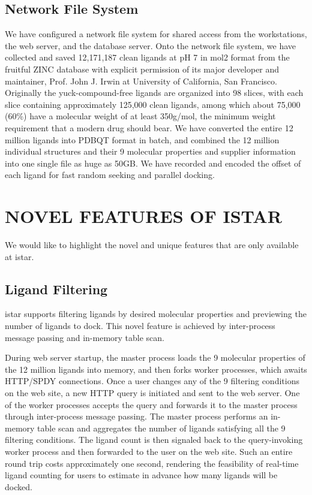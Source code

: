 \documentclass[12pt]{article}
\begin{document}
\subsection*{\sffamily \large Network File System}

We have configured a network file system for shared access from the workstations, the web server, and the database server. Onto the network file system, we have collected and saved 12,171,187 clean ligands at pH 7 in mol2 format from the fruitful ZINC database \citep{532,1178} with explicit permission of its major developer and maintainer, Prof. John J. Irwin at University of California, San Francisco. Originally the yuck-compound-free ligands are organized into 98 slices, with each slice containing approximately 125,000 clean ligands, among which about 75,000 (60\%) have a molecular weight of at least 350g/mol, the minimum weight requirement that a modern drug should bear. We have converted the entire 12 million ligands into PDBQT format in batch, and combined the 12 million individual structures and their 9 molecular properties and supplier information into one single file as huge as 50GB. We have recorded and encoded the offset of each ligand for fast random seeking and parallel docking.

\section*{\sffamily \Large NOVEL FEATURES OF ISTAR}

We would like to highlight the novel and unique features that are only available at istar.

\subsection*{\sffamily \large Ligand Filtering}

istar supports filtering ligands by desired molecular properties and previewing the number of ligands to dock. This novel feature is achieved by inter-process message passing and in-memory table scan.

During web server startup, the master process loads the 9 molecular properties of the 12 million ligands into memory, and then forks worker processes, which awaits HTTP/SPDY connections. Once a user changes any of the 9 filtering conditions on the web site, a new HTTP query is initiated and sent to the web server. One of the worker processes accepts the query and forwards it to the master process through inter-process message passing. The master process performs an in-memory table scan and aggregates the number of ligands satisfying all the 9 filtering conditions. The ligand count is then signaled back to the query-invoking worker process and then forwarded to the user on the web site. Such an entire round trip costs approximately one second, rendering the feasibility of real-time ligand counting for users to estimate in advance how many ligands will be docked.
\end{document}
